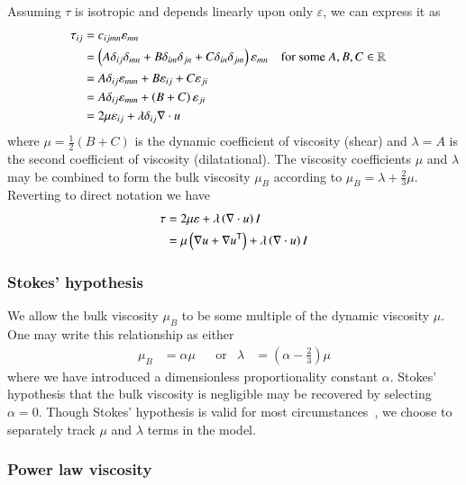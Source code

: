 \documentclass[letterpaper,11pt,nointlimits,reqno]{amsart}
\newcommand{\trans}[1]{{#1}^{\ensuremath{\mathsf{T}}}}
\begin{document}
Assuming $\tau$ is isotropic and depends linearly upon only $\varepsilon$,
we can express it as
\begin{align}
\tau_{ij}
&= c_{ijmn} \varepsilon_{mn}
\notag \\
&= \left( A \delta_{ij} \delta_{mn}
        + B \delta_{im} \delta_{jn}
        + C \delta_{in} \delta_{jm}
    \right) \varepsilon_{mn}
&
&\text{for some }A, B, C\in\mathbb{R}
\notag \\
&= A \delta_{ij} \varepsilon_{mm} + B\varepsilon_{ij} + C\varepsilon_{ji}
\notag \\
&= A \delta_{ij} \varepsilon_{mm} + \left( B+C \right)\varepsilon_{ji}
\notag \\
&= 2 \mu \varepsilon_{ij} + \lambda\delta_{ij}\nabla\cdot{}u
\end{align}
where $\mu=\frac{1}{2}\left( B + C \right)$ is the dynamic coefficient of
viscosity (shear) and $\lambda=A$ is the second coefficient of viscosity
(dilatational).  The viscosity coefficients $\mu$ and $\lambda$ may be combined
to form the bulk viscosity $\mu_{B}$ according to $\mu_{B}=\lambda +
\frac{2}{3}\mu$.  Reverting to direct notation we have
\begin{align}
\tau
&= 2 \mu \varepsilon + \lambda \left( \nabla\cdot{}u \right) I
\notag \\
\label{eq:taunewt}
&=   \mu \left( \nabla{}u + \trans{\nabla{}u} \right)
  + \lambda \left( \nabla\cdot{}u \right) I
\end{align}

\subsubsection{Stokes' hypothesis}

We allow the bulk viscosity $\mu_{B}$ to be some multiple of the dynamic
viscosity $\mu$.  One may write this relationship as either
\begin{align}
\label{eq:secondviscosityclaw}
\mu_{B} &= \alpha \mu
&
&\text{or}
&
\lambda &= \left( \alpha - \frac{2}{3} \right) \mu
\end{align}
where we have introduced a dimensionless proportionality constant $\alpha$.
Stokes' hypothesis that the bulk viscosity is negligible may be recovered by
selecting $\alpha = 0$.  Though Stokes' hypothesis is valid for most
circumstances~\cite{GadelHak1995}, we choose to separately track $\mu$ and
$\lambda$ terms in the model.

\subsubsection{Power law viscosity}
\end{document}
